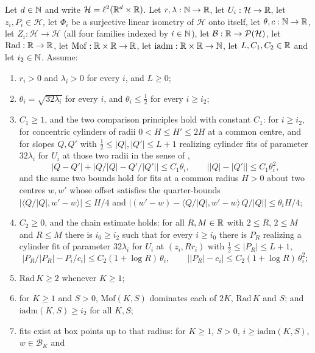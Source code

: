 \begin{lemma}
Let $d\in\mathbb{N}$ and write $\mathcal H=\ell^2(\mathbb{R}^d\times\mathbb{R})$. Let
$r,\lambda:\mathbb{N}\to\mathbb{R}$, let $U_i:\mathcal H\to\mathbb{R}$, let $z_i,P_i\in\mathcal H$, let
$\Phi_i$ be a surjective linear isometry of $\mathcal H$ onto itself, let
$\theta,c:\mathbb{N}\to\mathbb{R}$, let $Z_i:\mathcal H\to\mathcal H$ (all four families indexed
by $i\in\mathbb{N}$), let $\mathcal B:\mathbb{R}\to\mathcal P(\mathcal H)$, let
$\mathrm{Rad}:\mathbb{R}\to\mathbb{R}$, let $\mathrm{Mof}:\mathbb{R}\times\mathbb{R}\to\mathbb{R}$, let
$\mathrm{iadm}:\mathbb{R}\times\mathbb{R}\to\mathbb{N}$, let $L,C_1,C_2\in\mathbb{R}$ and let $i_2\in\mathbb{N}$.
Assume:
\begin{enumerate}
\item\label{it:eanf-pos} $r_i>0$ and $\lambda_i>0$ for every $i$, and $L\ge0$;
\item\label{it:eanf-th} $\theta_i=\sqrt{32\lambda_i}$ for every $i$, and
$\theta_i\le\tfrac12$ for every $i\ge i_2$;
\item\label{it:eanf-C1} $C_1\ge1$, and the two comparison principles hold with
constant $C_1$: for $i\ge i_2$, for concentric cylinders of radii
$0<H\le H'\le2H$ at a common centre, and for slopes $Q,Q'$ with
$\tfrac12\le|Q|,|Q'|\le L+1$ realizing cylinder fits of parameter
$32\lambda_i$ for $U_i$ at those two radii in the sense of
,
\[
  |Q-Q'|+\bigl|Q/|Q|-Q'/|Q'|\bigr|\le C_1\theta_i,\qquad
  \bigl||Q|-|Q'|\bigr|\le C_1\theta_i^2 ,
\]
and the same two bounds hold for fits at a common radius $H>0$ about two
centres $w,w'$ whose offset satisfies the quarter-bounds
$|\langle Q/|Q|,w'-w\rangle|\le H/4$ and
$\bigl|(w'-w)-\langle Q/|Q|,w'-w\rangle\,Q/|Q|\bigr|\le\theta_iH/4$;
\item\label{it:eanf-C2} $C_2\ge0$, and the chain estimate holds: for all
$R,M\in\mathbb{R}$ with $2\le R$, $2\le M$ and $R\le M$ there is $i_0\ge i_2$ such that
for every $i\ge i_0$ there is $P_R$ realizing a cylinder fit of parameter
$32\lambda_i$ for $U_i$ at $(z_i,Rr_i)$ with $\tfrac12\le|P_R|\le L+1$,
\[
  \bigl|P_R/|P_R|-P_i/c_i\bigr|\le C_2(1+\log R)\,\theta_i,
  \qquad
  \bigl||P_R|-c_i\bigr|\le C_2(1+\log R)\,\theta_i^2 ;
\]
\item\label{it:eanf-Rad} $\mathrm{Rad}\,K\ge2$ whenever $K\ge1$;
\item\label{it:eanf-Mof} for $K\ge1$ and $S>0$, $\mathrm{Mof}(K,S)$ dominates
each of $2K$, $\mathrm{Rad}\,K$ and $S$; and
$\mathrm{iadm}(K,S)\ge i_2$ for all $K,S$;
\item\label{it:eanf-fitw} fits exist at box points up to that radius: for
$K\ge1$, $S>0$, $i\ge\mathrm{iadm}(K,S)$, $w\in\mathcal B_K$ and

\end{enumerate}
\end{lemma}
